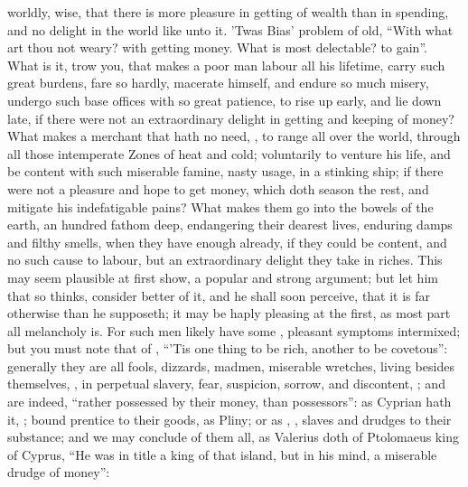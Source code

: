 worldly, wise, that there is more pleasure in getting of wealth than in
spending, and no delight in the world like unto it. 'Twas
Bias' problem of old, \enquote{With what art thou not weary? with
getting money. What is most delectable? to gain}. What is it, trow you, that
makes a poor man labour all his lifetime, carry such great burdens, fare so
hardly, macerate himself, and endure so much misery, undergo such base offices
with so great patience, to rise up early, and lie down late, if there were not
an extraordinary delight in getting and keeping of money? What makes a merchant
that hath no need, , to range all over the world,
through all those intemperate Zones of heat and cold;
voluntarily to venture his life, and be content with such miserable famine,
nasty usage, in a stinking ship; if there were not a pleasure and hope to get
money, which doth season the rest, and mitigate his indefatigable pains? What
makes them go into the bowels of the earth, an hundred fathom deep, endangering
their dearest lives, enduring damps and filthy smells, when they have enough
already, if they could be content, and no such cause to labour, but an
extraordinary delight they take in riches. This may seem plausible at first
show, a popular and strong argument; but let him that so thinks, consider
better of it, and he shall soon perceive, that it is far otherwise than he
supposeth; it may be haply pleasing at the first, as most part all melancholy
is. For such men likely have some , pleasant symptoms
intermixed; but you must note that of \Chrysostom{}, \enquote{'Tis
one thing to be rich, another to be covetous}: generally they are all fools,
dizzards, madmen, miserable wretches, living besides
themselves, , in perpetual slavery, fear, suspicion,
sorrow, and discontent, ; and are indeed,
\enquote{rather possessed by their money, than possessors}: as
Cyprian hath it, ; bound prentice
to their goods, as Pliny; or as \Chrysostom{}, , slaves and drudges to their substance; and we may conclude of them
all, as Valerius doth of Ptolomaeus king of Cyprus, \enquote{He
was in title a king of that island, but in his mind, a miserable drudge of
money}:

